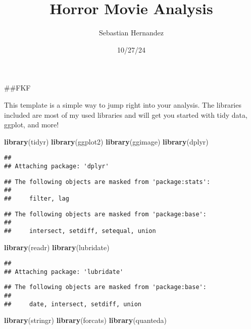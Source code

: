 \documentclass[
]{article}
\title{Horror Movie Analysis}
\author{Sebastian Hernandez}
\date{10/27/24}
\newenvironment{Shaded}{\begin{snugshade}}{\end{snugshade}}
\newcommand{\FunctionTok}[1]{\textcolor[rgb]{0.13,0.29,0.53}{\textbf{#1}}}
\newcommand{\NormalTok}[1]{#1}
\begin{document}
\maketitle

\#\#FKF

This template is a simple way to jump right into your analysis. The
libraries included are most of my used libraries and will get you
started with tidy data, ggplot, and more!

\begin{Shaded}
\begin{Highlighting}[]
\FunctionTok{library}\NormalTok{(tidyr)}
\FunctionTok{library}\NormalTok{(ggplot2)}
\FunctionTok{library}\NormalTok{(ggimage)}
\FunctionTok{library}\NormalTok{(dplyr)}
\end{Highlighting}
\end{Shaded}

\begin{verbatim}
## 
## Attaching package: 'dplyr'
\end{verbatim}

\begin{verbatim}
## The following objects are masked from 'package:stats':
## 
##     filter, lag
\end{verbatim}

\begin{verbatim}
## The following objects are masked from 'package:base':
## 
##     intersect, setdiff, setequal, union
\end{verbatim}

\begin{Shaded}
\begin{Highlighting}[]
\FunctionTok{library}\NormalTok{(readr)}
\FunctionTok{library}\NormalTok{(lubridate)}
\end{Highlighting}
\end{Shaded}

\begin{verbatim}
## 
## Attaching package: 'lubridate'
\end{verbatim}

\begin{verbatim}
## The following objects are masked from 'package:base':
## 
##     date, intersect, setdiff, union
\end{verbatim}

\begin{Shaded}
\begin{Highlighting}[]
\FunctionTok{library}\NormalTok{(stringr)}
\FunctionTok{library}\NormalTok{(forcats)}
\FunctionTok{library}\NormalTok{(quanteda)}
\end{Highlighting}
\end{Shaded}
\end{document}

